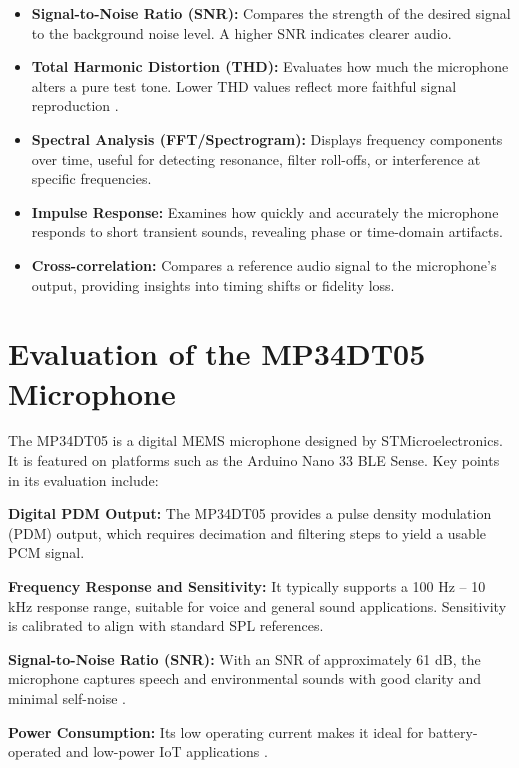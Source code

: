 \begin{itemize}
	\item \textbf{Signal-to-Noise Ratio (SNR):} Compares the strength of the desired signal to the background noise level. A higher SNR indicates clearer audio.
	
	\item \textbf{Total Harmonic Distortion (THD):} Evaluates how much the microphone alters a pure test tone. Lower THD values reflect more faithful signal reproduction \cite{Ward:2001}.
	
	\item \textbf{Spectral Analysis (FFT/Spectrogram):} Displays frequency components over time, useful for detecting resonance, filter roll-offs, or interference at specific frequencies.
	
	\item \textbf{Impulse Response:} Examines how quickly and accurately the microphone responds to short transient sounds, revealing phase or time-domain artifacts.
	
	\item \textbf{Cross-correlation:} Compares a reference audio signal to the microphone’s output, providing insights into timing shifts or fidelity loss.
\end{itemize}

\section{Evaluation of the MP34DT05 Microphone}

\bigskip
The MP34DT05 is a digital MEMS microphone designed by STMicroelectronics. It is featured on platforms such as the Arduino Nano 33 BLE Sense. Key points in its evaluation include:

\bigskip
\textbf{Digital PDM Output:} The MP34DT05 provides a pulse density modulation (PDM) output, which requires decimation and filtering steps to yield a usable PCM signal.

\bigskip
\textbf{Frequency Response and Sensitivity:} It typically supports a 100 Hz -- 10 kHz response range, suitable for voice and general sound applications. Sensitivity is calibrated to align with standard SPL references.

\bigskip
\textbf{Signal-to-Noise Ratio (SNR):} With an SNR of approximately 61 dB, the microphone captures speech and environmental sounds with good clarity and minimal self-noise \cite{STMicroelectronics:2021b}.

\bigskip
\textbf{Power Consumption:} Its low operating current makes it ideal for battery-operated and low-power IoT applications \cite{Arduino:2021}.

